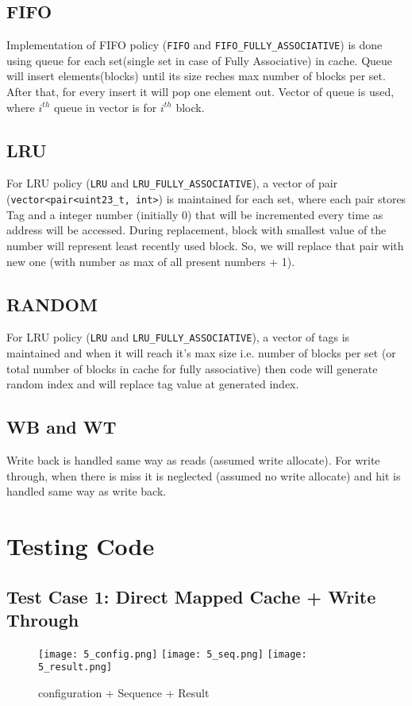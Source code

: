 \documentclass{article}
\begin{document}
\subsection{FIFO}
Implementation of FIFO policy (\texttt{FIFO} and \texttt{FIFO\_FULLY\_ASSOCIATIVE}) is done using queue for each set(single set in case of Fully Associative) in cache. Queue will insert elements(blocks) until its size reches max number of blocks per set. After that, for every insert it will pop one element out.
Vector of queue is used, where $i^{th}$ queue in vector is for $i^{th}$ block.

\subsection{LRU}
For LRU policy (\texttt{LRU} and \texttt{LRU\_FULLY\_ASSOCIATIVE}), a vector of pair (\texttt{vector<pair<uint23\_t, int>}) is maintained for each set, where each pair stores Tag and a integer number (initially 0) that will be incremented every time as address will be accessed. During replacement, block with smallest value of the number will represent least recently used block.
So, we will replace that pair with new one (with number as max of all present numbers + 1).

\subsection{RANDOM}
For LRU policy (\texttt{LRU} and \texttt{LRU\_FULLY\_ASSOCIATIVE}), a vector of tags is maintained and when it will reach it's max size i.e. number of blocks per set (or total number of blocks in cache for fully associative) then code will generate random index and will replace tag value at generated index.

\subsection{WB and WT}
Write back is handled same way as reads (assumed write allocate). For write through, when there is miss it is neglected (assumed no write allocate) and hit is handled same way as write back.

\section{Testing Code}

\subsection{Test Case 1: Direct Mapped Cache + Write Through}
\begin{figure}[H]{\centering}
    \texttt{[image: 5\_config.png]}
    \texttt{[image: 5\_seq.png]}
    \texttt{[image: 5\_result.png]}
    \caption[short]{configuration + Sequence + Result}
\end{figure}
\end{document}
